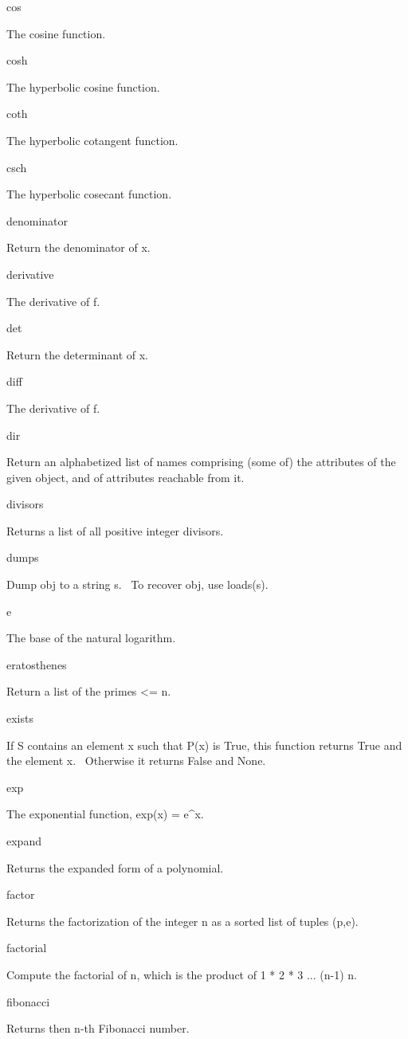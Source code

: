 \documentclass[12pt,twoside]{book}
\begin{document}
cos

The cosine function.

cosh

The hyperbolic cosine function.

coth

The hyperbolic cotangent function.

csch

The hyperbolic cosecant function.

denominator

Return the denominator of x.

derivative

The derivative of f.

det

Return the determinant of x.

diff

The derivative of f.

dir

Return an alphabetized list of names comprising (some of) the attributes of the given object, and of attributes reachable from it.

divisors

Returns a list of all positive integer divisors.

dumps

Dump obj to a string s. \ To recover obj, use loads(s).

e

The base of the natural logarithm.

eratosthenes

Return a list of the primes {\textless}= n.

exists

If S contains an element x such that P(x) is True, this function returns True and the element x. \ Otherwise it returns False and None.

exp

The exponential function, exp(x) = e\^{}x.

expand

Returns the expanded form of a polynomial.

factor

Returns the factorization of the integer n as a sorted list of tuples (p,e).

factorial

Compute the factorial of n, which is the product of 1 * 2 * 3 ... (n{}-1) n.

fibonacci

Returns then n{}-th Fibonacci number.
\end{document}
